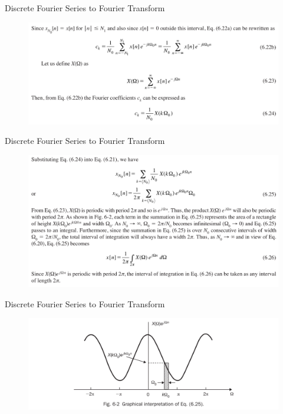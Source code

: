 \documentclass[pdflatex,compress,mathserif]{beamer}
\begin{document}
\begin{frame}{Discrete Fourier Series to Fourier Transform}
	\begin{figure}
		\centering
		\includegraphics[width=\linewidth]{img/img05}
	\end{figure}
\end{frame}

\begin{frame}{Discrete Fourier Series to Fourier Transform}
	\begin{figure}
		\centering
		\includegraphics[width=\linewidth]{img/img06}
	\end{figure}
\end{frame}

\begin{frame}{Discrete Fourier Series to Fourier Transform}
	\begin{figure}
		\centering
		\includegraphics[width=\linewidth]{img/img07}
	\end{figure}
\end{frame}
\end{document}
